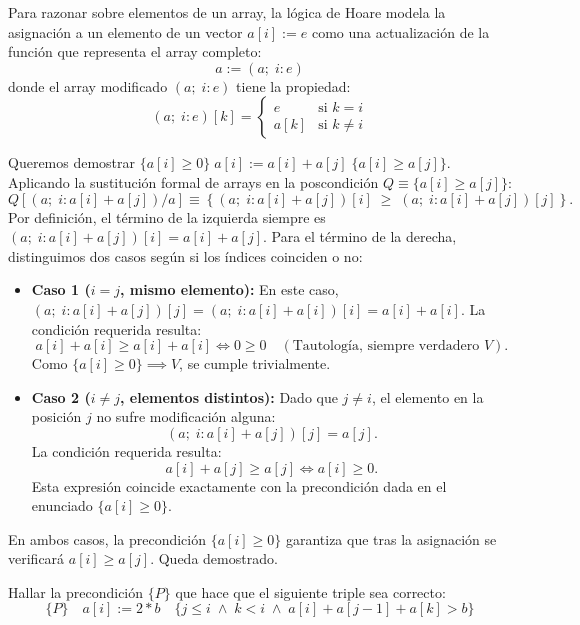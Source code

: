 \begin{solucion}
Para razonar sobre elementos de un array, la lógica de Hoare modela la asignación a un elemento de un vector $a[i] := e$ como una actualización de la función que representa el array completo:
\[
a := (a; \; i: e)
\]
donde el array modificado $(a; \; i: e)$ tiene la propiedad:
\[
(a; \; i: e)[k] = \begin{cases}
e & \text{si } k = i \\
a[k] & \text{si } k \neq i
\end{cases}
\]

Queremos demostrar $\{a[i] \ge 0\} \; a[i] := a[i] + a[j] \; \{a[i] \ge a[j]\}$.
Aplicando la sustitución formal de arrays en la poscondición $Q \equiv \{a[i] \ge a[j]\}$:
\[
Q[(a; \; i: a[i] + a[j]) / a] \equiv \left\{ (a; \; i: a[i] + a[j])[i] \;\ge\; (a; \; i: a[i] + a[j])[j] \right\}.
\]
Por definición, el término de la izquierda siempre es $(a; \; i: a[i] + a[j])[i] = a[i] + a[j]$.
Para el término de la derecha, distinguimos dos casos según si los índices coinciden o no:

\begin{itemize}[leftmargin=*]
    \item \textbf{Caso 1 ($i = j$, mismo elemento):}
    En este caso, $(a; \; i: a[i] + a[j])[j] = (a; \; i: a[i] + a[i])[i] = a[i] + a[i]$.
    La condición requerida resulta:
    \[
    a[i] + a[i] \ge a[i] + a[i] \iff 0 \ge 0 \quad (\text{Tautología, siempre verdadero } V).
    \]
    Como $\{a[i] \ge 0\} \implies V$, se cumple trivialmente.

    \item \textbf{Caso 2 ($i \neq j$, elementos distintos):}
    Dado que $j \neq i$, el elemento en la posición $j$ no sufre modificación alguna:
    \[
    (a; \; i: a[i] + a[j])[j] = a[j].
    \]
    La condición requerida resulta:
    \[
    a[i] + a[j] \ge a[j] \iff a[i] \ge 0.
    \]
    Esta expresión coincide exactamente con la precondición dada en el enunciado $\{a[i] \ge 0\}$.
\end{itemize}
En ambos casos, la precondición $\{a[i] \ge 0\}$ garantiza que tras la asignación se verificará $a[i] \ge a[j]$. Queda demostrado.
\end{solucion}

\begin{ejercicio}
Hallar la precondición $\{P\}$ que hace que el siguiente triple sea correcto:
\[
\{P\} \quad a[i] := 2 * b \quad \{j \le i \;\land\; k < i \;\land\; a[i] + a[j - 1] + a[k] > b\}
\]
\end{ejercicio}

